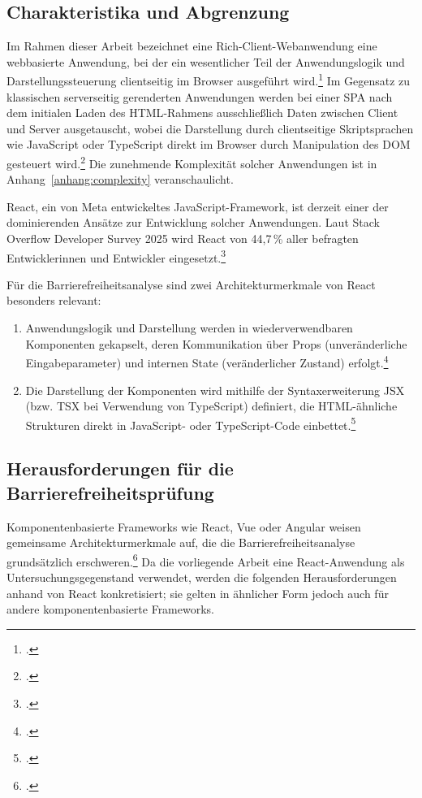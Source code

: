 \subsection{Charakteristika und Abgrenzung}

Im Rahmen dieser Arbeit bezeichnet eine Rich-Client-Webanwendung eine webbasierte Anwendung, bei der ein wesentlicher Teil der Anwendungslogik und Darstellungssteuerung clientseitig im Browser ausgeführt wird.\footcites[Vgl.][]{React}[][S. 184--186, 499--501]{sommerville2016software} Im Gegensatz zu klassischen serverseitig gerenderten Anwendungen werden bei einer \ac{SPA} nach dem initialen Laden des \acs{HTML}-Rahmens ausschließlich Daten zwischen Client und Server ausgetauscht, wobei die Darstellung durch clientseitige Skriptsprachen wie JavaScript oder TypeScript direkt im Browser durch Manipulation des \ac{DOM} gesteuert wird.\footcite[Vgl.][S. 59 ff.]{ReactRender, mikowskiSinglePageWeb2013} Die zunehmende Komplexität solcher Anwendungen ist in Anhang~\ref{anhang:complexity} veranschaulicht.

React, ein von Meta entwickeltes JavaScript-Framework, ist derzeit einer der dominierenden Ansätze zur Entwicklung solcher Anwendungen. Laut Stack Overflow Developer Survey 2025 wird React von 44{,}7\,\% aller befragten Entwicklerinnen und Entwickler eingesetzt.\footcite[Vgl.][]{Stack_Overflow_2025}

Für die Barrierefreiheitsanalyse sind zwei Architekturmerkmale von React besonders relevant:
\begin{enumerate}
    \item Anwendungslogik und Darstellung werden in wiederverwendbaren Komponenten gekapselt, deren Kommunikation über Props (unveränderliche Eingabeparameter) und internen State (veränderlicher Zustand) erfolgt.\footcite[Vgl.][]{React}
    \item Die Darstellung der Komponenten wird mithilfe der Syntaxerweiterung \ac{JSX} (bzw. TSX bei Verwendung von TypeScript) definiert, die \acs{HTML}-ähnliche Strukturen direkt in JavaScript- oder TypeScript-Code einbettet.\footcite[Vgl.][]{baiVirtualDom2022}
\end{enumerate}

\subsection{Herausforderungen für die Barrierefreiheitsprüfung} \label{Herausforderungen}

Komponentenbasierte Frameworks wie React, Vue oder Angular weisen gemeinsame Architekturmerkmale auf, die die Barrierefreiheitsanalyse grundsätzlich erschweren.\footcite[Vgl.][S. 110]{tafreshipour_ma11y_2024} Da die vorliegende Arbeit eine React-Anwendung als Untersuchungsgegenstand verwendet, werden die folgenden Herausforderungen anhand von React konkretisiert; sie gelten in ähnlicher Form jedoch auch für andere komponentenbasierte Frameworks.

